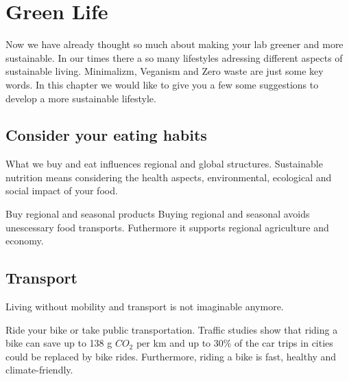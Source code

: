
\chapter{Green Life}\label{chap:more}
Now we have already thought so much about making your lab greener and more sustainable. 
In our times there a so many lifestyles adressing different aspects of sustainable living. 
Minimalizm, Veganism and Zero waste are just some key words. 
In this chapter we would like to give you a few some suggestions to develop a more sustainable lifestyle.


\section{Consider your eating habits} 
 	What we buy and eat influences regional and global structures. 
 	Sustainable nutrition means considering the health aspects, environmental, ecological and social impact of your food. \cite{food}
 	
 	
\begin{suggest}{Buy regional and seasonal products}
  	Buying regional and seasonal avoids unescessary food transports. 
  	Futhermore it supports regional agriculture and economy. 
\end{suggest}

\section{Transport}
	Living without mobility and transport is not imaginable anymore. 
\begin{suggest}{Ride your bike or take public transportation.}
	Traffic studies show that riding a bike can save up to 138 g $CO_{2}$  per km and up to 30\% of the car trips in cities could be replaced by bike rides.\cite{bike}
	Furthermore, riding a bike is fast, healthy and climate-friendly. 
\end{suggest}


